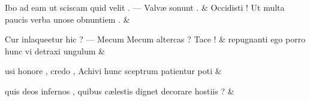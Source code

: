 \documentclass[12pt,onecolumn,twoside,a4paper]{memoir}
\begin{document}
\begin{pairs}
\begin{Leftside}
                              Ibo
                              ad
                              eam
                              ut
                              sciscam
                              quid
                              velit
                              .
                              —
                              Valvæ
                              sonunt
                              . \&
                         \stanza {}
                     Occidisti
                              !
                              Ut
                              multa
                              paucis
                              verba
                              unose
                              obnuntiem
                              . \&
                         \stanza {}
                     
                              Cur
                              inlaqueetur
                              hic
                              ?
                              —
                              Mecum
                              {Mecum}
                              altercas
                              ?
                              Tace
                              ! \&
                         \stanza {}
                     repugnanti
                              ego
                              porro
                              hunc
                              vi
                              detraxi
                              ungulum \&
                         \stanza {}
                     
                              usi
                              honore
                              ,
                              credo
                              ,
                              Achivi
                              hunc
                              sceptrum
                              patientur
                              poti \&
                         \stanza {}
                     
                              quis
                              deos
                              infernos
                              ,
                              quibus
                              cælestis
                              dignet
                              decorare
                              hostiis
                              ? \&
                         \stanza {}
                     

\end{Leftside}
\end{pairs}
\end{document}
